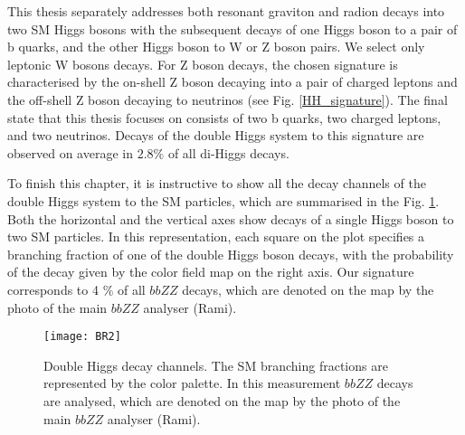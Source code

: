 This thesis separately addresses both resonant graviton and radion decays into two SM Higgs bosons with the subsequent decays of one Higgs boson to a pair of b quarks, and the other Higgs boson to W or Z boson pairs. We select only leptonic W bosons decays. For Z boson decays, the chosen signature is characterised by the on-shell Z boson decaying into a pair of charged leptons and the off-shell Z boson decaying to neutrinos (see Fig. \ref{HH_signature}). The final state that this thesis focuses on consists of two b quarks, two charged leptons, and two neutrinos. Decays of the double Higgs system to this signature are observed on average in $2.8 \%$ of all di-Higgs decays. 


To finish this chapter, it is instructive to show all the decay channels of the double Higgs system to the SM particles, which are summarised in the Fig. \ref{BR}. Both the horizontal and the vertical axes show decays of a single Higgs boson to two SM particles. In this representation, each square on the plot specifies a branching fraction of one of the double Higgs boson decays, with the probability of the decay given by the color field map on the right axis. Our signature corresponds to 4 $\%$ of all $bbZZ$ decays, which are denoted on the map by the photo of the main $bbZZ$ analyser (Rami). 

\begin{figure}[H]
  \centering
    \texttt{[image: BR2]}
    \caption[Double Higgs decay channels]{Double Higgs decay channels. The SM branching fractions are represented by the color palette. In this measurement $bbZZ$ decays are analysed, which are denoted on the map by the photo of the main $bbZZ$ analyser (Rami).}
    \label{BR}
\end{figure}



